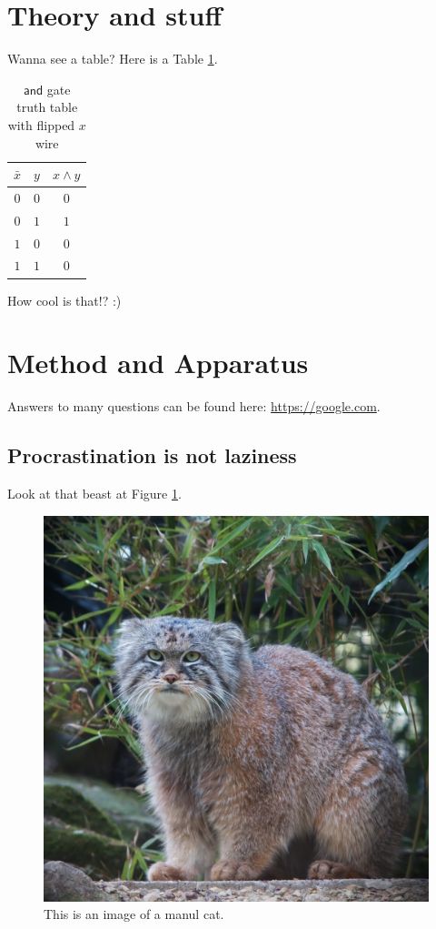 \section{Theory and stuff}

Wanna see a table? Here is a Table \ref{table1}.
\begin{table}[ht!]
\centering
\begin{tabular}{ | c | c | c | }
    \hline
    $\bar{x}$ & $y$ & $x \land y$ \\ \hline 
    $0$ & $0$ & $0$ \\ \hline
    $0$ &  $1$ & $1$ \\ \hline
    $1$ &  $0$ & $0$ \\ \hline
    $1$ &  $1$ & $0$ \\ 
    \hline
  \end{tabular}
\caption{$\mathsf{and}$ gate truth table with flipped $x$ wire
\label{table1}}
\end{table}

How cool is that!? :)

\section{Method and Apparatus}
Answers to many questions can be found here: \url{https://google.com}.
\subsection{Procrastination is not laziness}
Look at that beast at Figure \ref{manul}.
\begin{figure}[ht!]
\begin{center}
\leavevmode
\includegraphics[scale=0.1]{../images/manul.jpg}
\end{center}
\caption{This is an image of a manul cat. \label{manul}}
\end{figure}